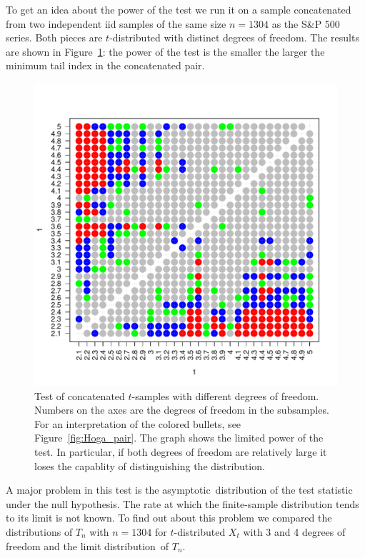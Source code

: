 \documentclass[11pt,a4]{amsart}
\newcommand{\asy}{asymptotic}
\newcommand{\ds}{distribution}
\newcommand{\1}{{\mathbf 1}}
\begin{document}
\par
To get an idea about the power of the test we run it on a
sample concatenated from two independent iid samples of the same size $n=1304$ as the S\&P 500 series. 
Both pieces are $t$-distributed with distinct degrees
of freedom. The results are shown in Figure~\ref{fig:t_sim_pair}: the power of the test is the smaller the larger the minimum
tail index in the concatenated pair.
\begin{figure}[htb!]
  \centering
  \includegraphics[width=\textwidth, trim={1.0cm 1.5cm 1cm 2cm},
  clip]{t_sim_pair.pdf}
  \caption{Test  of concatenated $t$-samples with different
    degrees of freedom. Numbers on the axes are the degrees of freedom in the subsamples. For an interpretation of the colored
bullets, see Figure~\ref{fig:Hoga_pair}. The graph shows the limited power of the test. In particular, if
both degrees of freedom are relatively large it loses the capablity of  distinguishing the \ds .}
  \label{fig:t_sim_pair}
\end{figure}
\par
A major problem in this test is the \asy\ distribution of the test statistic under the
null hypothesis.  The rate at which the finite-sample distribution tends to its limit is not known.
To find out about this problem we compared the \ds s of $T_n$ 
with $n=1304$ for $t$-distributed $X_t$ with  3 and 4 degrees of freedom and the limit \ds\ of $T_n$.
\end{document}
